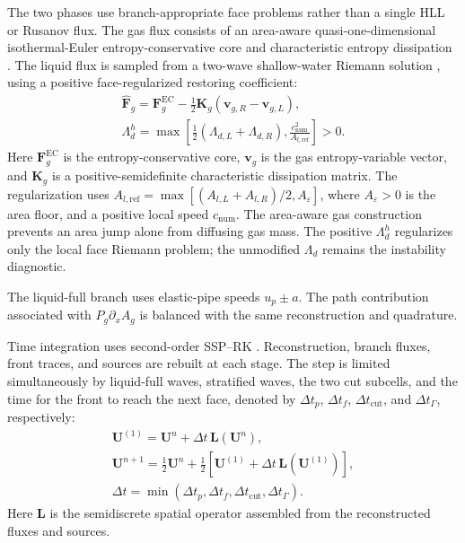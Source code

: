 The two phases use branch-appropriate face problems rather than a single HLL
or Rusanov flux. The gas flux consists of an area-aware quasi-one-dimensional
isothermal-Euler entropy-conservative core and characteristic entropy
dissipation \cite{winters2020,chan2024}. The liquid flux is sampled from a
two-wave shallow-water Riemann solution \cite{toro2001}, using a positive
face-regularized restoring coefficient:
\begin{equation}
\begin{gathered}
\widehat{\mathbf F}_g
=\mathbf F_g^{\mathrm{EC}}
-\tfrac12\mathbf K_g(\mathbf v_{g,R}-\mathbf v_{g,L}),\\[3pt]
\Lambda_{d}^{h}
=\max\!\left[
\tfrac12(\Lambda_{d,L}+\Lambda_{d,R}),
\frac{c_{\mathrm{num}}^2}{A_{l,\mathrm{ref}}}
\right]>0.
\end{gathered}
\label{eq:regular_fluxes}
\end{equation}
Here $\mathbf F_g^{\mathrm{EC}}$ is the entropy-conservative core,
$\mathbf v_g$ is the gas entropy-variable vector, and $\mathbf K_g$ is a
positive-semidefinite characteristic dissipation matrix. The regularization
uses
$A_{l,\mathrm{ref}}=\max[(A_{l,L}+A_{l,R})/2,A_\varepsilon]$, where
$A_\varepsilon>0$ is the area floor, and a positive local speed
$c_{\mathrm{num}}$.
The area-aware gas construction prevents an area jump alone from diffusing gas
mass. The positive $\Lambda_d^h$ regularizes only the local face Riemann
problem; the unmodified $\Lambda_d$ remains the instability diagnostic.
\begin{samepage}
The liquid-full branch uses elastic-pipe speeds $u_p\pm a$. The path
contribution associated with $P_g\partial_xA_g$ is balanced with the same
reconstruction and quadrature.
\end{samepage}

Time integration uses second-order SSP--RK \cite{gottlieb2001}. Reconstruction,
branch fluxes, front traces, and sources are rebuilt at each stage. The step is
limited simultaneously by liquid-full waves, stratified waves, the two cut
subcells, and the time for the front to reach the next face, denoted by
$\Delta t_p$, $\Delta t_f$, $\Delta t_{\mathrm{cut}}$, and $\Delta t_\Gamma$,
respectively:
\begin{equation}
\begin{gathered}
\mathbf U^{(1)}=\mathbf U^n+\Delta t\,\mathbf L(\mathbf U^n),\\[3pt]
\mathbf U^{n+1}=\tfrac12\mathbf U^n
+\tfrac12\left[\mathbf U^{(1)}
+\Delta t\,\mathbf L(\mathbf U^{(1)})\right],\\[3pt]
\Delta t=\min(\Delta t_p,\Delta t_f,
\Delta t_{\mathrm{cut}},\Delta t_\Gamma).
\end{gathered}
\label{eq:ssprk_cfl}
\end{equation}
Here $\mathbf L$ is the semidiscrete spatial operator assembled from the
reconstructed fluxes and sources.

